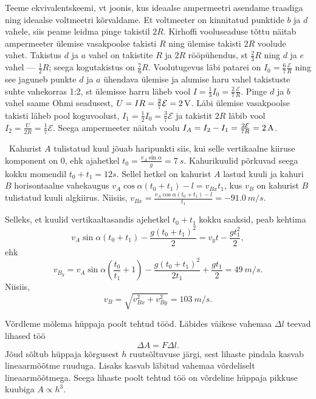 \documentclass[10pt]{article}
\begin{document}
Teeme ekvivalentskeemi, vt joonis, kus ideaalse ampermeetri asendame traadiga ning ideaalse voltmeetri kõrvaldame. Et voltmeeter on kinnitatud punktide $b$ ja $d$ vahele, siis peame leidma pinge takistil $2R$. Kirhoffi vooluseaduse tõttu näitab ampermeeter ülemise vasakpoolse takisti $R$ ning ülemise takisti $2R$ voolude vahet. Takistus $d$ ja $a$ vahel on takistite $R$ ja $2R$ rööpühendus, st $\frac 23R$ ning $d$ ja $e$ vahel --- $\frac 12R$; seega kogutakistus on $\frac 76R$. Voolutugevus läbi patarei on $I_0=\frac 67\frac{\mathcal E}R$ ning see jaguneb punkte $d$ ja $a$ ühendava ülemise ja alumise haru vahel takistuste suhte vahekorras 1:2, st ülemisse harru läheb vool $I=\frac 13I_0=\frac 27\frac{\mathcal E}R$. Pinge $d$ ja $b$ vahel saame Ohmi seadusest, $U=IR=\frac 27\mathcal E=\SI 2V$. Läbi ülemise vasakpoolse takisti läheb pool koguvoolust, $I_1=\frac 12 I_0=\frac 37\mathcal E$ ja takistit $2R$ läbib vool $I_2=\frac U{2R}= \frac 17\mathcal E$. Seega ampermeeter näitab voolu $I_A=I_2-I_1=\frac{2\mathcal E}{7R}=\SI 2A$.
\probend
\bigskip


\solu
\
Kahurist $A$ tulistatud kuul jõuab haripunkti siis, kui selle vertikaalne kiiruse komponent on $0$, ehk ajahetkel $t_0 = \frac{v_A\sin\alpha}{g} = \SI{7}{s}$. Kahurikuulid põrkuvad seega kokku momendil $t_0 + t_1 = \SI{12}s$. Sellel hetkel on kahurist $A$ lastud kuuli ja kahuri $B$ horisontaalne vahekaugus $v_A\cos\alpha(t_0 + t_1) - l = v_{Bx}t_1$, kus $v_B$ on kahurist $B$ tulistatud kuuli algkiirus. Niisiis, $v_{Bx} = \frac{v_A\cos\alpha(t_0 + t_1) - l}{t_1} = \SI{-91.0}{m/s}$.

Selleks, et kuulid vertikaaltasandis ajehetkel $t_0 + t_1$ kokku saaksid, peab kehtima
\[
v_A\sin\alpha (t_0 + t_1) - \frac{g(t_0 + t_1)^2}{2} = v_yt - \frac{gt_1^2}{2},
\]
ehk
\[
v_{B_y} = v_A\sin\alpha \left(\frac{t_0}{t_1} + 1\right) - \frac{g(t_0 + t_1)^2}{2t_1} + \frac{gt_1}{2} = \SI{49}{m/s}.
\]
Niisiis,
\[
v_B = \sqrt{v_{Bx}^2 + v_{By}^2} = \SI{103}{m/s}.
\]
\probend
\bigskip


\solu
Võrdleme mõlema hüppaja poolt tehtud tööd. Läbides väikese vahemaa $\Delta l$ teevad lihased töö
$$\Delta A = F \Delta l.$$
Jõud sõltub hüppaja kõrgusest $h$ ruutsõltuvuse järgi, sest lihaste pindala kasvab lineaarmõõtme ruuduga. Lisaks kasvab läbitud vahemaa võrdeliselt lineaarmõõtmega. Seega lihaste poolt tehtud töö on võrdeline hüppaja pikkuse kuubiga $A \propto h^3$.
\end{document}
